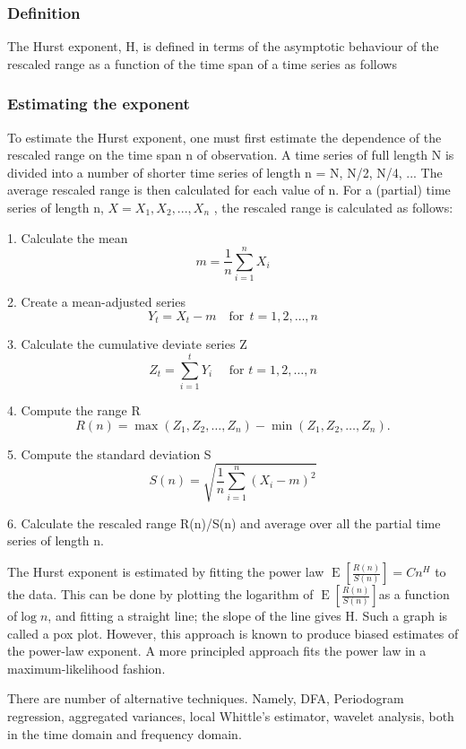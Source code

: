 \documentclass[12pt]{article}
\begin{document}
\subsubsection{Definition}
The Hurst exponent, H, is defined in terms of the asymptotic behaviour of the rescaled range as a function of the time span of a time series as follows

\subsubsection{Estimating the exponent}
To estimate the Hurst exponent, one must first estimate the dependence of the rescaled range on the time span n of observation. A time series of full length N is divided into a number of shorter time series of length n = N, N/2, N/4, ... The average rescaled range is then calculated for each value of n.
For a (partial) time series of length n, $X=X_1,X_2,..., X_n $ , the rescaled range is calculated as follows:

1. Calculate the mean
$$m=\frac{1}{n} \sum_{i=1}^{n} X_i$$

2. Create a mean-adjusted series
$$Y_t=X_{t}-m \quad \text{for}~~ t=1,2, \dots ,n $$

3. Calculate the cumulative deviate series Z
$$Z_t= \sum_{i=1}^{t} Y_{i} \quad \text{ for } t=1,2, \dots ,n $$

4. Compute the range R
$$R(n) =\operatorname{max}\left (Z_1, Z_2, \dots, Z_n \right )- \operatorname{min}\left (Z_1, Z_2, \dots, Z_n \right ). $$

5. Compute the standard deviation S
$$S(n)= \sqrt{\frac{1}{n} \sum_{i=1}^{n}\left ( X_{i} - m \right )^{2}}$$

6. Calculate the rescaled range R(n)/S(n) and average over all the partial time series of length n.

The Hurst exponent is estimated by fitting the power law $\operatorname{E} \left [ \frac{R(n)}{S(n)} \right ]=C n^H$ to the data. This can be done by plotting the logarithm of $\operatorname{E} \left [ \frac{R(n)}{S(n)} \right ] $as a function of$ \log n$, and fitting a straight line; the slope of the line gives H. Such a graph is called a pox plot. However, this approach is known to produce biased estimates of the power-law exponent. A more principled approach fits the power law in a maximum-likelihood fashion.

There are number of alternative techniques. Namely, DFA, Periodogram regression, aggregated variances, local Whittle's estimator, wavelet analysis, both in the time domain and frequency domain.
\end{document}
